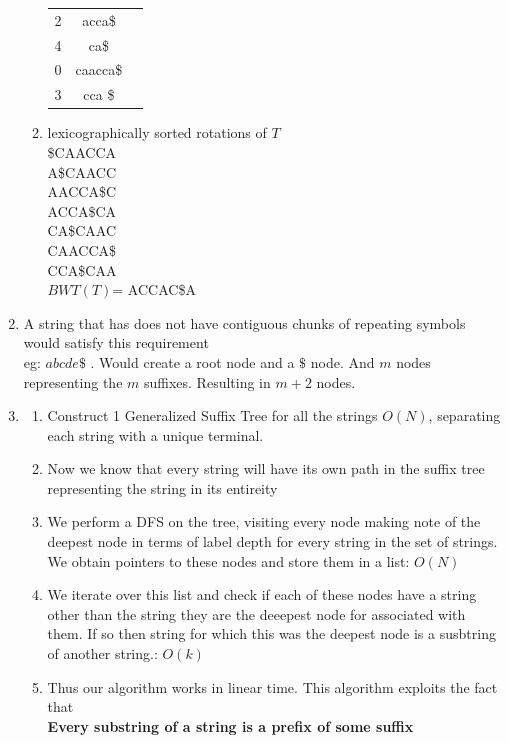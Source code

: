 \documentclass[12pt]{article}
\begin{document}
\begin{enumerate}
\begin{enumerate}
\begin{tabular}{ |c|c|c| }
             2 & acca\$\\
             4 & ca\$\\
             0 & caacca\$\\
             3 & cca \$\\
             \hline
            \end{tabular}
        \item 
            lexicographically sorted rotations of $T$ \\
            \$CAACCA \\
            A\$CAACC \\
            AACCA\$C \\
            ACCA\$CA \\
            CA\$CAAC \\
            CAACCA\$ \\
            CCA\$CAA \\
            $BWT(T)$= ACCAC\$A
    \end{enumerate}
\item A string that has does not have contiguous chunks of repeating symbols would satisfy this requirement \\
    eg: $abcde\$$ . Would create a root node and a $\$$ node. And $m$ nodes representing the $m$ suffixes. Resulting in
     $m+2$ nodes.
\item
    \begin{enumerate}
        \item Construct 1 Generalized Suffix Tree for all the strings $O(N)$, separating each string with a unique terminal.
        \item Now we know that every string will have its own path in the suffix tree representing the string in its entireity
        \item We perform a DFS on the tree, visiting every node making note of the deepest node in terms of label depth
        for every string in the set of strings. We obtain pointers to these nodes and store them in a list: $O(N)$
        \item We iterate over this list and check if each of these nodes have a string other than the string they are
        the deeepest node for associated with them. If so then string for which this was the deepest node is a susbtring
        of another string.: $O(k)$
        \item Thus our algorithm works in linear time. This algorithm exploits the fact that \\
        \textbf{Every substring of a string is a prefix of some suffix}
    

\end{enumerate}
\end{enumerate}
\end{document}
